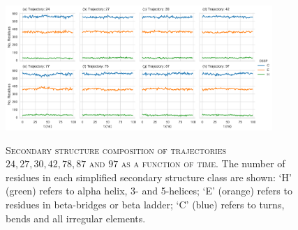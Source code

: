 \begin{figure}[ph!]
 \centering
 \caption[Secondary structure composition of select trajectories]{\textsc{Secondary structure composition of trajectories $24, 27, 30, 42, 78, 87$ and $97$ as a function of time}. The number of residues in each simplified secondary structure class\cite{kabschDictionaryProteinSecondary1983} are shown: `H' (green) refers to alpha helix, 3- and 5-helices; `E' (orange) refers to residues in beta-bridges or beta ladder; `C' (blue) refers to turns, bends and all irregular elements.}
 \includegraphics[width=0.9\textwidth]{chapters/aadh/figures/drift_trajs_dssp.png}
 \label{fig:dssp_trajs_sens}
\end{figure}

